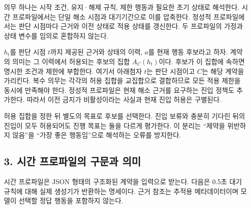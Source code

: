 \documentclass[11pt,a4paper]{article}
\begin{document}
의무 하나는 시작 조건, 유지·해제 규칙, 제한 행동과 필요한 초기 상태로 해석한다. 시간 프로파일에서는 단일 해소 시점과 대기기간으로 이를 압축한다. 정성적 프로파일에서는 판단 시점마다 근거와 이전 상태로 적용 상태를 갱신한다. 두 프로파일의 가정과 상태 변수를 임의로 혼합하지 않는다.\par

\(h_t\)를 판단 시점 \(t\)까지 제공된 근거와 상태의 이력, \(a\)를 현재 행동 후보라고 하자. 계약의 의미는 그 이력에서 허용되는 후보의 집합 \(A_C(h_t)\)이다. 후보가 이 집합에 속하면 명시한 조건과 제한에 부합한다. 여기서 아래첨자 \(t\)는 판단 시점이고 \(C\)는 해당 계약을 가리킨다. 복수 의무는 각각의 허용 집합을 교집합으로 결합하므로 모든 적용 제한을 동시에 만족해야 한다. 정성적 프로파일은 현재 해소 근거를 요구하는 진입 정책도 추가한다. 따라서 이전 금지가 비활성이라는 사실과 현재 진입 허용은 구별된다.\par

허용 집합을 정한 뒤 별도의 목표로 후보를 선택한다. 진입 보류와 충분히 기다린 뒤의 진입이 모두 허용되어도 진행 목표는 둘을 다르게 평가한다. 이 분리는 “제약을 위반하지 않음”을 “가장 좋은 행동임”으로 해석하는 오류를 방지한다.\par

\subsection*{3. 시간 프로파일의 구문과 의미}

시간 프로파일은 JSON 형태의 구조화된 계약을 입력으로 받는다. 다음은 0.5초 대기 규칙에 대해 실제 생성기가 반환하는 명세이다. 근거 참조는 추적용 메타데이터이며 모델이 선택할 정답 행동을 포함하지 않는다.\par
\end{document}
